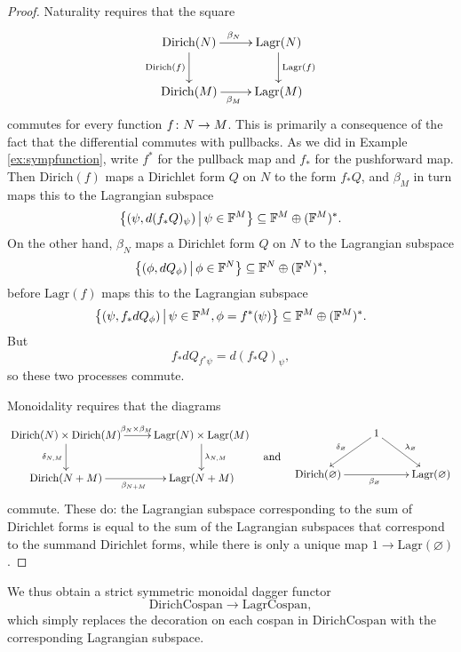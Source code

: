 \begin{proof}
Naturality requires that the square
\[
\xymatrix{
  \mathrm{Dirich}(N) \ar[r]^{\beta_N} \ar[d]_{\mathrm{Dirich}(f)} &
  \mathrm{Lagr}(N) \ar[d]^{\mathrm{Lagr}(f)}  \\
  \mathrm{Dirich}(M) \ar[r]_{\beta_M} & \mathrm{Lagr}(M)
}
\]
commutes for every function $f{\colon} N \to M$. This is primarily a consequence of the
fact that the differential commutes with pullbacks. As we did in Example
\ref{ex:sympfunction},
write $f^\ast$ for the pullback map and $f_\ast$ for the pushforward map.
Then $\mathrm{Dirich}(f)$ maps a Dirichlet form $Q$ on $N$ to the form $f_\ast Q$,
and $\beta_M$ in turn maps this to the Lagrangian subspace 
\[
  \big\{(\psi,d(f_\ast Q)_\psi) \, \big\vert \, \psi \in {\mathbb F}^M\big\} \subseteq
  {\mathbb F}^M \oplus ({\mathbb F}^M)^\ast.
\]
On the other hand, $\beta_N$ maps a Dirichlet form $Q$ on $N$ to the Lagrangian
subspace
\[
\big\{(\phi,dQ_\phi) \,\big\vert\, \phi \in {\mathbb F}^N\big\}\subseteq
  {\mathbb F}^N \oplus ({\mathbb F}^N)^\ast, 
\]
before $\mathrm{Lagr}(f)$ maps this to the Lagrangian subspace
\[
  \big\{(\psi, f_\ast dQ_\phi) \,\big\vert\, \psi \in {\mathbb F}^M, \phi =
  f^\ast(\psi)\big\} \subseteq {\mathbb F}^M\oplus ({\mathbb F}^M)^\ast.
\]
But 
\[
  f_\ast dQ_{f^\ast\psi} = d(f_\ast Q)_{\psi},
\]
so these two processes commute.

Monoidality requires that the diagrams 
\[
\begin{aligned}
\xymatrix{
  \mathrm{Dirich}(N) \times \mathrm{Dirich}(M) \ar[r]^(.52){\beta_N \times
  \beta_M} \ar[d]_{\delta_{N,M}} & \mathrm{Lagr}(N) \times \mathrm{Lagr}(M)
  \ar[d]^{\lambda_{N,M}}  \\
  \mathrm{Dirich}(N+M) \ar[r]_{\beta_{N+M}} & \mathrm{Lagr}(N+M)
}
\end{aligned}
\quad
\mbox{and}
\quad
\begin{aligned}
\xymatrix{
  & 1 \ar[dl]_{\delta_\varnothing} \ar[dr]^{\lambda_\varnothing}\\
\mathrm{Dirich}(\varnothing)  \ar[rr]_{\beta_\varnothing} &&
\mathrm{Lagr}(\varnothing)
}
\end{aligned}
\]
commute. These do: the Lagrangian subspace corresponding to the sum of Dirichlet
forms is equal to the sum of the Lagrangian subspaces that correspond to the
summand Dirichlet forms, while there is only a unique map $1 \to
\mathrm{Lagr}(\varnothing)$.
\end{proof}

We thus obtain a strict symmetric monoidal dagger functor 
\[   
\mathrm{DirichCospan} \to \mathrm{LagrCospan},
\]
which simply replaces the decoration on each cospan in $\mathrm{DirichCospan}$
with the corresponding Lagrangian subspace.

